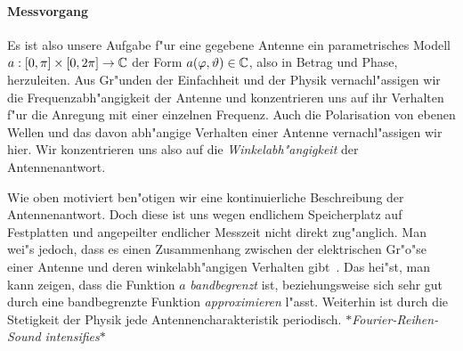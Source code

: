 \paragraph{Messvorgang}
%
%
Es ist also unsere Aufgabe f"ur eine gegebene Antenne ein parametrisches Modell $a: [0, \pi] \times [0, 2\pi] \rightarrow \mathbb{C}$ der Form $a(\varphi, \vartheta) \in \mathbb{C}$, also in Betrag und Phase, herzuleiten.
Aus Gr"unden der Einfachheit und der Physik vernachl"assigen wir die Frequenzabh"angigkeit der Antenne und konzentrieren uns auf ihr Verhalten f"ur die Anregung mit einer einzelnen Frequenz.
Auch die Polarisation von ebenen Wellen und das davon abh"angige Verhalten einer Antenne vernachl"assigen wir hier.
Wir konzentrieren uns also auf die \emph{Winkelabh"angigkeit} der Antennenantwort.

Wie oben motiviert ben"otigen wir eine kontinuierliche Beschreibung der Antennenantwort.
Doch diese ist uns wegen endlichem Speicherplatz auf Festplatten und angepeilter endlicher Messzeit nicht direkt zug"anglich.
Man wei"s jedoch, dass es einen Zusammenhang zwischen der elektrischen Gr"o"se einer Antenne und deren winkelabh"angigen Verhalten gibt~\cite[Kapitel~4]{delgaldo2007phd}.
Das hei"st, man kann zeigen, dass die Funktion $a$ \emph{bandbegrenzt} ist, beziehungsweise sich sehr gut durch eine bandbegrenzte Funktion \emph{approximieren} l"asst.
Weiterhin ist durch die Stetigkeit der Physik jede Antennencharakteristik periodisch.
\emph{$\ast$Fourier-Reihen-Sound intensifies$\ast$}

